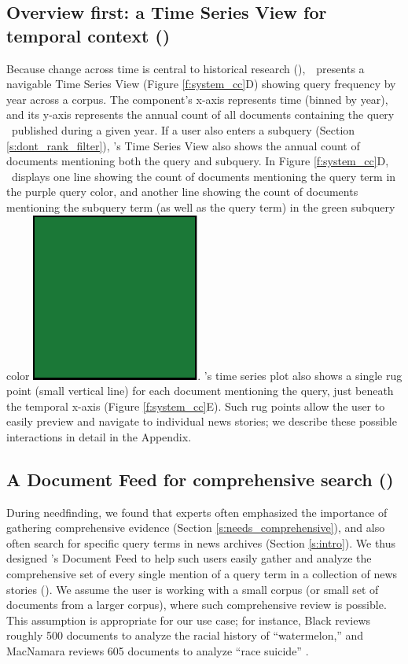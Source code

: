 \subsection{Overview first: a Time Series View for temporal context (\roverview)}\label{s:system_ts}

Because change across time is central to historical research (\roverview),~\ours~presents a navigable Time Series View (Figure \ref{f:system_cc}D) showing query frequency by year across a corpus.
The component's x-axis represents time (binned by year), and its y-axis represents the annual count of all documents containing the query \Q~published during a given year.
If a user also enters a subquery (Section \ref{s:dont_rank_filter}), \ours's Time Series View also shows the annual count of documents mentioning both the query and subquery.
In Figure \ref{f:system_cc}D, \ours~displays one line showing the count of documents mentioning the query term in the purple query color, and another line showing the count of documents mentioning the subquery term (as well as the query term) in the green subquery color \includegraphics[scale=0.06]{figures/CCGreen.pdf}.
\ours's time series plot also shows a single rug point (small vertical line) for each document mentioning the query, just beneath the temporal x-axis (Figure \ref{f:system_cc}E).
Such rug points allow the user to easily preview and navigate to individual news stories; we describe these possible interactions in detail in the Appendix.

\subsection{A Document Feed for comprehensive search (\rcomprehensive)}\label{s:feed_and_viewer}

During needfinding, we found that experts often emphasized the importance of gathering comprehensive evidence (Section \ref{s:needs_comprehensive}), and also often search for specific query terms in news archives (Section \ref{s:intro}).
We thus designed \ours's {Document Feed} to help such users easily gather and analyze the comprehensive set of every single mention of a query term in a collection of news stories (\rcomprehensive).
We assume the user is working with a small corpus (or small set of documents from a larger corpus), where such comprehensive review is possible. 
This assumption is appropriate for our use case; 
for instance, Black reviews roughly 500 documents to analyze the racial history of ``watermelon,'' \cite{watermelon} and MacNamara reviews 605 documents to analyze ``race suicide'' \cite{racesuicide}.

